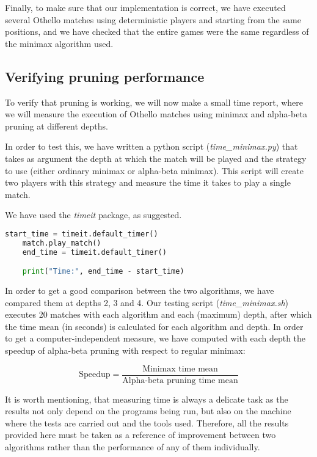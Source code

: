 \documentclass{article}
\begin{document}
Finally, to make sure that our implementation is correct, we have executed several Othello matches using deterministic players and starting from the same positions, and we have checked that the entire games were the same regardless of the minimax algorithm used. 

\subsection{Verifying pruning performance}\label{intro:performance}

To verify that pruning is working, we will now make a small time report, where we will measure the execution of Othello matches using minimax and alpha-beta pruning at different depths.

In order to test this, we have written a python script (\emph{time\_minimax.py}) that takes as argument the depth at which the match will be played and the strategy to use (either ordinary minimax or alpha-beta minimax). This script will create two players with this strategy and measure the time it takes to play a single match. 

We have used the \textit{timeit} package, as suggested.

\begin{lstlisting}[language=python,captionpos=t,caption=Match time measure]
    start_time = timeit.default_timer()
    match.play_match()
    end_time = timeit.default_timer()

    print("Time:", end_time - start_time)
\end{lstlisting}

In order to get a good comparison between the two algorithms, we have compared them at depths 2, 3 and 4. Our testing script (\emph{time\_minimax.sh}) executes 20 matches with each algorithm and each (maximum) depth, after which the time mean (in seconds) is calculated for each algorithm and depth. In order to get a computer-independent
measure, we have computed with each depth the speedup of alpha-beta pruning with respect to regular minimax:

    $$\text{Speedup}=\frac{\text{Minimax time mean}}{\text{Alpha-beta pruning time mean}}$$

It is worth mentioning, that measuring time is always a delicate task as the results not only depend on the programs being run, but also on the machine where the tests are carried out and the tools used. Therefore, all the results provided here must be taken as a reference of improvement between two algorithms rather than the performance of any of them individually.
\end{document}
